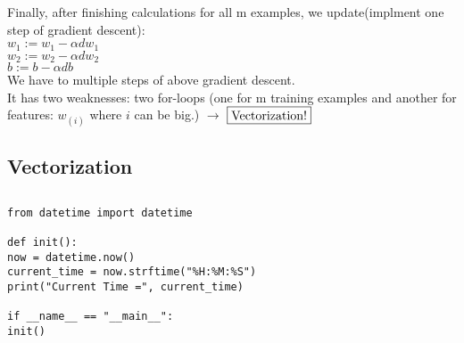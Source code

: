 \documentclass{article}
\begin{document}
Finally, after finishing calculations for all m examples, we update(implment one step of gradient descent):\\

$w_1 := w_1 - \alpha dw_1$\\
$w_2 := w_2 - \alpha dw_2$\\
$b := b - \alpha db $\\

We have to multiple steps of above gradient descent.\\

It has two weaknesses: two for-loops (one for m training examples and another for features: $w_{(i)}$ where $i$ can be big.) $\rightarrow$ $\fbox{Vectorization!}$

\newpage
\subsection{Vectorization}

\newpage
\subsection{}

\lstset{language=Python}
\begin{lstlisting}
from datetime import datetime

def init():
now = datetime.now()
current_time = now.strftime("%H:%M:%S")
print("Current Time =", current_time)

if __name__ == "__main__":
init()
\end{lstlisting}
\end{document}
